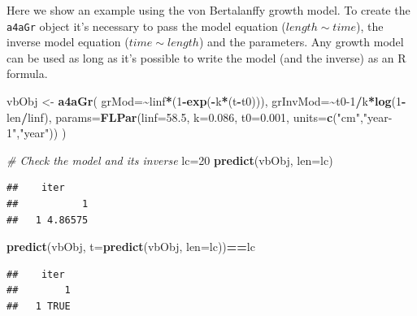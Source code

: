 \documentclass[
]{book}
\newenvironment{Shaded}{\begin{snugshade}}{\end{snugshade}}
\newcommand{\AttributeTok}[1]{\textcolor[rgb]{0.13,0.29,0.53}{#1}}
\newcommand{\CommentTok}[1]{\textcolor[rgb]{0.56,0.35,0.01}{\textit{#1}}}
\newcommand{\DecValTok}[1]{\textcolor[rgb]{0.00,0.00,0.81}{#1}}
\newcommand{\FloatTok}[1]{\textcolor[rgb]{0.00,0.00,0.81}{#1}}
\newcommand{\FunctionTok}[1]{\textcolor[rgb]{0.13,0.29,0.53}{\textbf{#1}}}
\newcommand{\NormalTok}[1]{#1}
\newcommand{\OtherTok}[1]{\textcolor[rgb]{0.56,0.35,0.01}{#1}}
\newcommand{\SpecialCharTok}[1]{\textcolor[rgb]{0.81,0.36,0.00}{\textbf{#1}}}
\newcommand{\StringTok}[1]{\textcolor[rgb]{0.31,0.60,0.02}{#1}}
\begin{document}
Here we show an example using the von Bertalanffy growth model. To create the \texttt{a4aGr} object it's necessary to pass the model equation (\(length \sim time\)), the inverse model equation (\(time \sim length\)) and the parameters. Any growth model can be used as long as it's possible to write the model (and the inverse) as an R formula.

\begin{Shaded}
\begin{Highlighting}[]
\NormalTok{vbObj }\OtherTok{\textless{}{-}} \FunctionTok{a4aGr}\NormalTok{(}
    \AttributeTok{grMod=}\SpecialCharTok{\textasciitilde{}}\NormalTok{linf}\SpecialCharTok{*}\NormalTok{(}\DecValTok{1}\SpecialCharTok{{-}}\FunctionTok{exp}\NormalTok{(}\SpecialCharTok{{-}}\NormalTok{k}\SpecialCharTok{*}\NormalTok{(t}\SpecialCharTok{{-}}\NormalTok{t0))),      }
    \AttributeTok{grInvMod=}\SpecialCharTok{\textasciitilde{}}\NormalTok{t0}\DecValTok{{-}1}\SpecialCharTok{/}\NormalTok{k}\SpecialCharTok{*}\FunctionTok{log}\NormalTok{(}\DecValTok{1}\SpecialCharTok{{-}}\NormalTok{len}\SpecialCharTok{/}\NormalTok{linf),      }
    \AttributeTok{params=}\FunctionTok{FLPar}\NormalTok{(}\AttributeTok{linf=}\FloatTok{58.5}\NormalTok{, }\AttributeTok{k=}\FloatTok{0.086}\NormalTok{, }\AttributeTok{t0=}\FloatTok{0.001}\NormalTok{, }\AttributeTok{units=}\FunctionTok{c}\NormalTok{(}\StringTok{"cm"}\NormalTok{,}\StringTok{"year{-}1"}\NormalTok{,}\StringTok{"year"}\NormalTok{))     }
\NormalTok{)}

\CommentTok{\# Check the model and its inverse}
\NormalTok{lc}\OtherTok{=}\DecValTok{20}
\FunctionTok{predict}\NormalTok{(vbObj, }\AttributeTok{len=}\NormalTok{lc)}
\end{Highlighting}
\end{Shaded}

\begin{verbatim}
##    iter
##           1
##   1 4.86575
\end{verbatim}

\begin{Shaded}
\begin{Highlighting}[]
\FunctionTok{predict}\NormalTok{(vbObj, }\AttributeTok{t=}\FunctionTok{predict}\NormalTok{(vbObj, }\AttributeTok{len=}\NormalTok{lc))}\SpecialCharTok{==}\NormalTok{lc}
\end{Highlighting}
\end{Shaded}

\begin{verbatim}
##    iter
##        1
##   1 TRUE
\end{verbatim}
\end{document}
